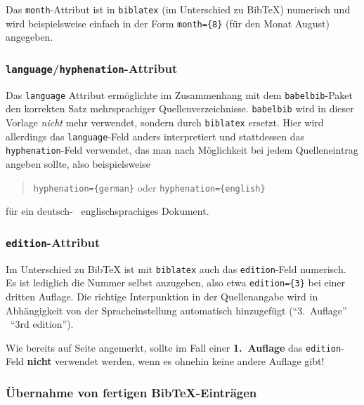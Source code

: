 Das \texttt{month}-Attribut ist in \texttt{biblatex} (im Unterschied zu BibTeX) numerisch
und wird beispielsweise einfach in der Form \verb!month={8}! (für den Monat August)
angegeben.

\subsubsection{\texttt{language}/\texttt{hyphenation}-Attribut}

Das \texttt{language} Attribut ermöglichte im Zusammenhang mit dem \texttt{babelbib}-Paket 
den korrekten Satz mehrsprachiger Quellenverzeichnisse. \texttt{babelbib} wird in 
dieser Vorlage \emph{nicht} mehr verwendet, sondern durch \texttt{biblatex} \cite{Lehman2011} ersetzt.
Hier wird allerdings das \texttt{language}-Feld anders interpretiert und
stattdessen das \texttt{hyphenation}-Feld verwendet, das man nach Möglichkeit 
bei jedem Quelleneintrag angeben sollte, also beispielsweise
\begin{quote}
\verb!hyphenation={german}! \quad oder \quad \verb!hyphenation={english}!
\end{quote}
für ein deutsch- \bzw\ englischsprachiges Dokument.

\subsubsection{\texttt{edition}-Attribut}

Im Unterschied zu BibTeX ist mit \texttt{biblatex} auch das \texttt{edition}-Feld numerisch.
Es ist lediglich die Nummer selbst anzugeben, also etwa
\verb!edition={3}!
bei einer dritten Auflage. Die richtige Interpunktion in der Quellenangabe wird in Abhängigkeit von der Spracheinstellung automatisch hinzugefügt 
("`3.\ Auflage"' \bzw\ "`3rd edition"').

Wie bereits auf Seite \pageref{sec:@book} angemerkt, sollte im Fall einer
\textbf{1.~Auflage} das \texttt{edition}-Feld \textbf{nicht} verwendet werden,
wenn es ohnehin keine andere Auflage gibt!


\subsubsection{Übernahme von fertigen BibTeX-Einträgen}

